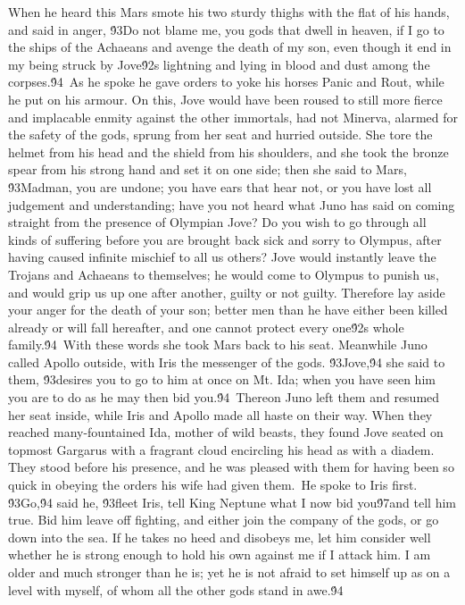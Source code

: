 {When he heard this Mars smote his two sturdy thighs with the flat of his hands, and said in anger, \'93Do not blame me, you gods that dwell in heaven, if I go to the ships of the Achaeans and avenge the death of my son, even though it end in my being struck by Jove\'92s lightning and lying in blood and dust among the corpses.\'94\
As he spoke he gave orders to yoke his horses Panic and Rout, while he put on his armour. On this, Jove would have been roused to still more fierce and implacable enmity against the other immortals, had not Minerva, alarmed for the safety of the gods, sprung from her seat and hurried outside. She tore the helmet from his head and the shield from his shoulders, and she took the bronze spear from his strong hand and set it on one side; then she said to Mars, \'93Madman, you are undone; you have ears that hear not, or you have lost all judgement and understanding; have you not heard what Juno has said on coming straight from the presence of Olympian Jove? Do you wish to go through all kinds of suffering before you are brought back sick and sorry to Olympus, after having caused infinite mischief to all us others? Jove would instantly leave the Trojans and Achaeans to themselves; he would come to Olympus to punish us, and would grip us up one after another, guilty or not guilty. Therefore lay aside your anger for the death of your son; better men than he have either been killed already or will fall hereafter, and one cannot protect every one\'92s whole family.\'94\
With these words she took Mars back to his seat. Meanwhile Juno called Apollo outside, with Iris the messenger of the gods. \'93Jove,\'94 she said to them, \'93desires you to go to him at once on Mt. Ida; when you have seen him you are to do as he may then bid you.\'94\
Thereon Juno left them and resumed her seat inside, while Iris and Apollo made all haste on their way. When they reached many-fountained Ida, mother of wild beasts, they found Jove seated on topmost Gargarus with a fragrant cloud encircling his head as with a diadem. They stood before his presence, and he was pleased with them for having been so quick in obeying the orders his wife had given them.\
He spoke to Iris first. \'93Go,\'94 said he, \'93fleet Iris, tell King Neptune what I now bid you\'97and tell him true. Bid him leave off fighting, and either join the company of the gods, or go down into the sea. If he takes no heed and disobeys me, let him consider well whether he is strong enough to hold his own against me if I attack him. I am older and much stronger than he is; yet he is not afraid to set himself up as on a level with myself, of whom all the other gods stand in awe.\'94\
}
